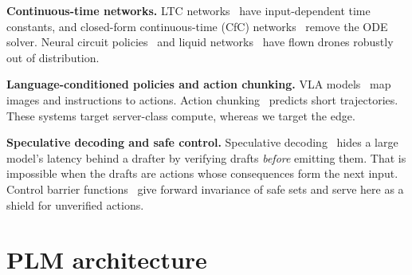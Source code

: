 \documentclass[12pt]{article}
\begin{document}
\textbf{Continuous-time networks.} LTC networks~\citep{hasani2021ltc} have input-dependent time constants, and closed-form continuous-time (CfC) networks~\citep{hasani2022cfc} remove the ODE solver. Neural circuit policies~\citep{lechner2020ncp} and liquid networks~\citep{chahine2023robust} have flown drones robustly out of distribution.

\textbf{Language-conditioned policies and action chunking.} VLA models~\citep{brohan2022rt1,brohan2023rt2,kim2024openvla,octo2024,black2024pi0} map images and instructions to actions. Action chunking~\citep{zhao2023act,chi2023diffusion} predicts short trajectories. These systems target server-class compute, whereas we target the edge.

\textbf{Speculative decoding and safe control.} Speculative decoding~\citep{leviathan2023fast,chen2023accelerating,li2024eagle} hides a large model's latency behind a drafter by verifying drafts \emph{before} emitting them. That is impossible when the drafts are actions whose consequences form the next input. Control barrier functions~\citep{ames2019cbf} give forward invariance of safe sets and serve here as a shield for unverified actions.

\section{PLM architecture}\label{sec:model}
\end{document}
